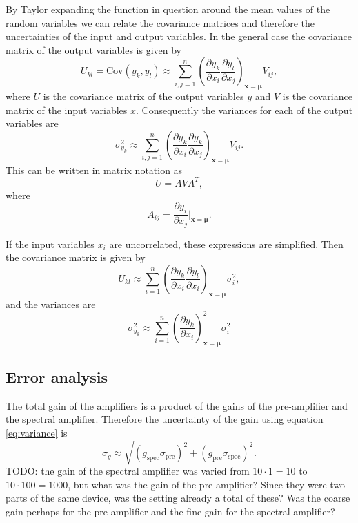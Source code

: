 \documentclass[a4paper]{article}
\newenvironment{todo}{
\color{red}
}
{
}
\begin{document}
By Taylor expanding the function in question around the mean values of the random variables we can relate the covariance matrices and therefore the uncertainties of the input and output variables.
In the general case the covariance matrix of the output variables is given by
\begin{equation}
U_{kl}
= \mathrm{Cov}(y_k, y_l)
\approx \sum_{i,j=1}^n \left( \frac{\partial y_k}{\partial x_i} \frac{\partial y_l}{\partial x_j} \right)_{\mathbf{x}=\mathbf{\mu}} V_{ij},
\end{equation}
where $U$ is the covariance matrix of the output variables $y$ and $V$ is the covariance matrix of the input variables $x$.
Consequently the variances for each of the output variables are
\begin{equation}
\sigma_{y_k}^2 \approx \sum_{i,j=1}^n \left( \frac{\partial y_k}{\partial x_i} \frac{\partial y_k}{\partial x_j} \right)_{\mathbf{x}=\mathbf{\mu}} V_{ij}.
\end{equation}
This can be written in matrix notation as
\begin{equation}
U = AVA^T,
\end{equation}
where
\begin{equation}
A_{ij} = \frac{\partial y_i}{\partial x_j} \vert_{\boldsymbol{x}=\boldsymbol{\mu}}.
\end{equation}
\cite[p. 20--22]{cowan_statistical_1998}

If the input variables $x_i$ are uncorrelated, these expressions are simplified.
Then the covariance matrix is given by
\begin{equation}
U_{kl} \approx \sum_{i=1}^n \left( \frac{\partial y_k}{\partial x_i} \frac{\partial y_l}{\partial x_i} \right)_{\mathbf{x}=\mathbf{\mu}} \sigma_i^2,
\end{equation}
and the variances are
\begin{equation}
\sigma_{y_k}^2 \approx \sum_{i=1}^n \left( \frac{\partial y_k}{\partial x_i} \right)_{\mathbf{x}=\mathbf{\mu}}^2 \sigma_i^2
\label{eq:variance}
\end{equation}
\cite[p. 20--22]{cowan_statistical_1998}


\subsection{Error analysis}
\begin{todo}
The total gain of the amplifiers is a product of the gains of the pre-amplifier and the spectral amplifier.
Therefore the uncertainty of the gain using equation \ref{eq:variance} is
\begin{equation}
\sigma_g \approx \sqrt{(g_\text{spec} \sigma_\text{pre})^2 + (g_\text{pre}\sigma_\text{spec})^2}.
\end{equation}
TODO: the gain of the spectral amplifier was varied from $10\cdot1=10$ to $10\cdot100=1000$, but what was the gain of the pre-amplifier?
Since they were two parts of the same device, was the setting already a total of these?
Was the coarse gain perhaps for the pre-amplifier and the fine gain for the spectral amplifier?
\end{todo}
\end{document}
